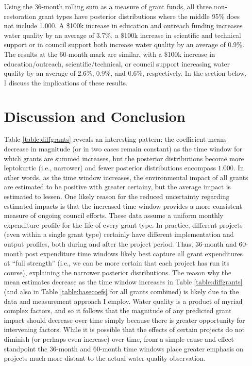 \documentclass[11pt,a4paper,titlepage]{article}
\begin{document}
Using the 36-month rolling sum as a measure of grant funds, all three non-restoration grant types have posterior distributions where the middle 95\% does not include 1.000. A \$100k increase in education and outreach funding increases water quality by an average of 3.7\%, a \$100k increase in scientific and technical support or in council support both increase water quality by an average of 0.9\%. The results at the 60-month mark are similar, with a \$100k increase in education/outreach, scientific/technical, or council support increasing water quality by an average of 2.6\%, 0.9\%, and 0.6\%, respectively. In the section below, I discuss the implications of these results. 

\section*{Discussion and Conclusion}

Table \ref{table:diffgrants} reveals an interesting pattern: the coefficient means decrease in magnitude (or in two cases remain constant) as the time window for which grants are summed increases, but the posterior distributions become more leptokurtic (i.e., narrower) and fewer posterior distributions encompass $1.000$. In other words, as the time window increases, the environmental impact of all grants are estimated to be positive with greater certainy, but the average impact is estimated to lessen. One likely reason for the reduced uncertainty regarding estimated impacts is that the increased time window provides a more consistent measure of ongoing council efforts. These data assume a uniform monthly expenditure profile for the life of every grant type. In practice, different projects (even within a single grant type) certainly have different implementation and output profiles, both during and after the project period. Thus, 36-month and 60-month post expenditure time windows likely best capture all grant expenditures at ``full strength'' (i.e., we can be more certain that each project has run its course), explaining the narrower posterior distributions. The reason why the mean estimates decrease as the time window increases in Table \ref{table:diffgrants} (and also in Table \ref{table:basecoefs} for all grants combined) is likely due to the data and measurement approach I employ. Water quality is a product of myriad complex factors, and so it follows that the magnitude of any predicted grant impact should decrease over time simply because there is greater opportunity for intervening factors. While it is possible that the effects of certain projects do not diminish (or perhaps even increase) over time, from a simple cause-and-effect standpoint the 36-month and 60-month time windows place greater emphasis on projects much more distant to the actual water quality observation.
\end{document}
